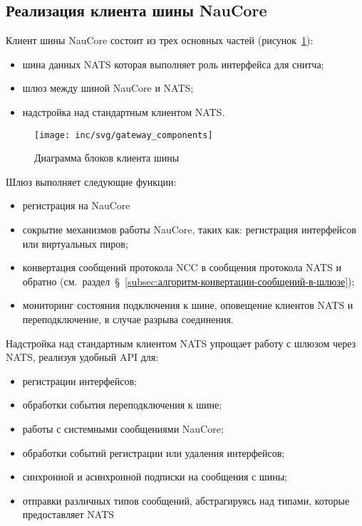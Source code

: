 \subsection{Реализация клиента шины NauCore}\label{subsec:реализация-клиента-шины-naucore}

Клиент шины NauCore состоит из трех основных частей (рисунок~\ref{pic:gateway:components}):
\begin{itemize}
    \item шина данных NATS которая выполняет роль интерфейса для снитча;
    \item шлюз между шиной NauCore и NATS;
    \item надстройка над стандартным клиентом NATS\@.
\end{itemize}

\begin{figure}[ht]
    \centering
    \texttt{[image: inc/svg/gateway\_components]}
    \caption{Диаграмма блоков клиента шины}
    \label{pic:gateway:components}
\end{figure}

Шлюз выполняет следующие функции:
\begin{itemize}
    \item регистрация на NauCore
    \item сокрытие механизмов работы NauCore, таких как: регистрация интерфейсов или виртуальных пиров;
    \item конвертация сообщений протокола NCC в сообщения протокола NATS и обратно (см.~раздел~\S~\ref{subsec:алгоритм-конвертации-сообщений-в-шлюзе});
    \item мониторинг состояния подключения к шине, оповещение клиентов NATS и переподключение, в случае разрыва соединения.
\end{itemize}

Надстройка над стандартным клиентом NATS упрощает работу с шлюзом через NATS,
реализуя удобный API для:
\begin{itemize}
    \item регистрации интерфейсов;
    \item обработки события переподключения к шине;
    \item работы с системными сообщениями NauCore;
    \item обработки событий регистрации или удаления интерфейсов;
    \item синхронной и асинхронной подписки на сообщения с шины;
    \item отправки различных типов сообщений, абстрагируясь над типами, которые предоставляет NATS\@
\end{itemize}

